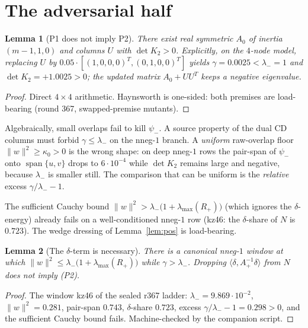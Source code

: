 \documentclass[11pt]{article}
\newtheorem{lemma}{Lemma}
\theoremstyle{remark}
\newcommand{\lam}{\lambda_{-}}
\newcommand{\psim}{\psi_{-}}
\newcommand{\Rp}{R_{+}}
\newcommand{\Ap}{A_{+}}
\begin{document}
\section{The adversarial half}\label{sec:adv}

\begin{lemma}[P1 does not imply P2]\label{lem:adv}
There exist real symmetric $A_{0}$ of inertia $(m-1,1,0)$ and
columns $U$ with $\det K_{2}>0$.  Explicitly, on the $4$-node
model, replacing $U$ by $0.05\cdot[(1,0,0,0)^{T},(0,1,0,0)^{T}]$
yields $\gamma=0.0025<\lam=1$ and $\det K_{2}=+1.0025>0$; the
updated matrix $A_{0}+UU^{T}$ keeps a negative eigenvalue.
\end{lemma}

\begin{proof}
Direct $4\times4$ arithmetic.  Haynsworth is one-sided: both
premises are load-bearing (round 367, swapped-premise mutants).
\end{proof}

Algebraically, small overlaps fail to kill $\psim$.  A source
property of the dual CD columns must forbid $\gamma\le\lam$ on the
nneg-$1$ branch.  A \emph{uniform} raw-overlap floor
$\|w\|^{2}\ge\kappa_{0}>0$ is the wrong shape: on deep nneg-$1$
rows the pair-span of $\psim$ onto $\operatorname{span}\{u,v\}$
drops to $6\cdot10^{-4}$ while $\det K_{2}$ remains large and
negative, because $\lam$ is smaller still.  The comparison that
can be uniform is the \emph{relative} excess $\gamma/\lam-1$.

The sufficient Cauchy bound $\|w\|^{2}>\lam\bigl(1+\lambda_{\max}(\Rp)\bigr)$
(which ignores the $\delta$-energy) already fails on a well-conditioned
nneg-$1$ row (kz46: the $\delta$-share of $N$ is $0.723$).  The wedge
dressing of Lemma~\ref{lem:pos} is load-bearing.

\begin{lemma}[The $\delta$-term is necessary]\label{lem:delta}
There is a canonical nneg-$1$ window at which
$\|w\|^{2}\le\lam\bigl(1+\lambda_{\max}(\Rp)\bigr)$ while
$\gamma>\lam$.  Dropping $\langle\delta,\Ap^{-1}\delta\rangle$ from
$N$ does not imply (P2).
\end{lemma}

\begin{proof}
The window kz46 of the sealed r367 ladder: $\lam=9.869\cdot10^{-2}$,
$\|w\|^{2}=0.281$, pair-span $0.743$, $\delta$-share $0.723$,
excess $\gamma/\lam-1=0.298>0$, and the sufficient Cauchy bound
fails.  Machine-checked by the companion script.
\end{proof}
\end{document}
